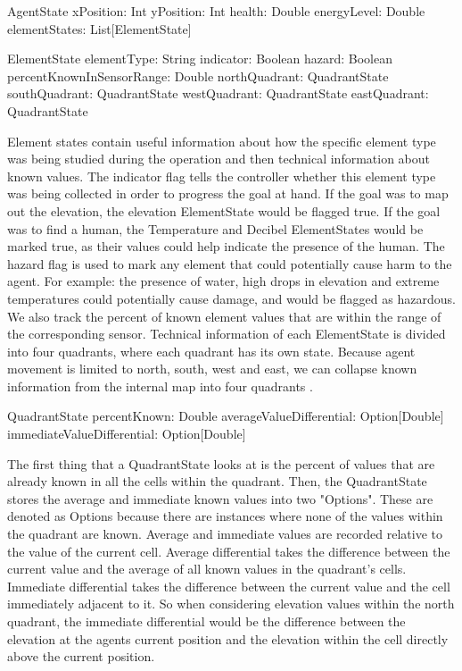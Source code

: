 AgentState {
  xPosition: Int
  yPosition: Int
  health: Double
  energyLevel: Double
  elementStates: List[ElementState]
}

ElementState {
  elementType: String
  indicator: Boolean
  hazard: Boolean
  percentKnownInSensorRange: Double
  northQuadrant: QuadrantState
  southQuadrant: QuadrantState
  westQuadrant: QuadrantState
  eastQuadrant: QuadrantState
}

Element states contain useful information about how the specific element type was being studied during the operation and then technical information about known values.
The indicator flag tells the controller whether this element type was being collected in order to progress the goal at hand.
If the goal was to map out the elevation, the elevation ElementState would be flagged true.
If the goal was to find a human, the Temperature and Decibel ElementStates would be marked true, as their values could help indicate the presence of the human.
The hazard flag is used to mark any element that could potentially cause harm to the agent.
For example: the presence of water, high drops in elevation and extreme temperatures could potentially cause damage, and would be flagged as hazardous.
We also track the percent of known element values that are within the range of the corresponding sensor.
Technical information of each ElementState is divided into four quadrants, where each quadrant has its own state.
Because agent movement is limited to north, south, west and east, we can collapse known information from the internal map into four quadrants .

QuadrantState {
  percentKnown: Double
  averageValueDifferential: Option[Double]
  immediateValueDifferential: Option[Double]
}

The first thing that a QuadrantState looks at is the percent of values that are already known in all the cells within the quadrant.
Then, the QuadrantState stores the average and immediate known values into two "Options".
These are denoted as Options because there are instances where none of the values within the quadrant are known.
Average and immediate values are recorded relative to the value of the current cell.
Average differential takes the difference between the current value and the average of all known values in the quadrant's cells.
Immediate differential takes the difference between the current value and the cell immediately adjacent to it.
So when considering elevation values within the north quadrant, the immediate differential would be the difference between the elevation at the agents current position and the elevation within the cell directly above the current position.


